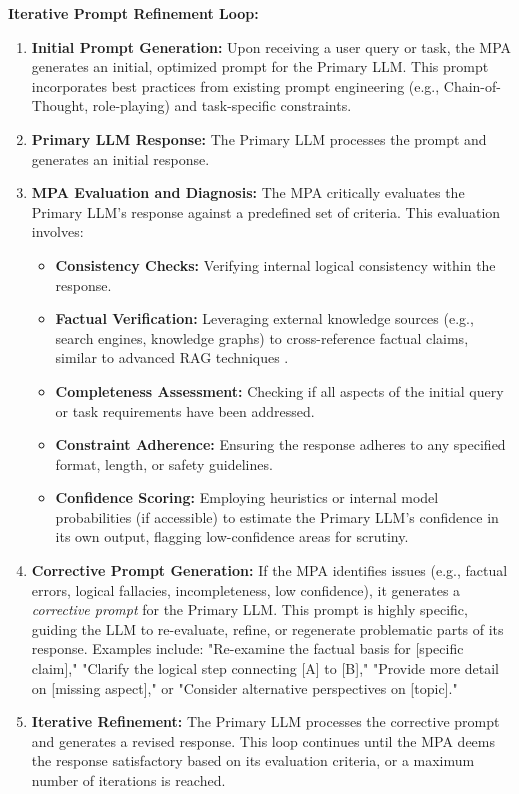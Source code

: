 \documentclass{article}
\begin{document}
\textbf{Iterative Prompt Refinement Loop:}
\begin{enumerate}
    \item \textbf{Initial Prompt Generation:} Upon receiving a user query or task, the MPA generates an initial, optimized prompt for the Primary LLM. This prompt incorporates best practices from existing prompt engineering (e.g., Chain-of-Thought, role-playing) and task-specific constraints.
    \item \textbf{Primary LLM Response:} The Primary LLM processes the prompt and generates an initial response.
    \item \textbf{MPA Evaluation and Diagnosis:} The MPA critically evaluates the Primary LLM's response against a predefined set of criteria. This evaluation involves:
    \begin{itemize}
        \item \textbf{Consistency Checks:} Verifying internal logical consistency within the response.
        \item \textbf{Factual Verification:} Leveraging external knowledge sources (e.g., search engines, knowledge graphs) to cross-reference factual claims, similar to advanced RAG techniques \cite{P5}.
        \item \textbf{Completeness Assessment:} Checking if all aspects of the initial query or task requirements have been addressed.
        \item \textbf{Constraint Adherence:} Ensuring the response adheres to any specified format, length, or safety guidelines.
        \item \textbf{Confidence Scoring:} Employing heuristics or internal model probabilities (if accessible) to estimate the Primary LLM's confidence in its own output, flagging low-confidence areas for scrutiny.
    \end{itemize}
    \item \textbf{Corrective Prompt Generation:} If the MPA identifies issues (e.g., factual errors, logical fallacies, incompleteness, low confidence), it generates a \textit{corrective prompt} for the Primary LLM. This prompt is highly specific, guiding the LLM to re-evaluate, refine, or regenerate problematic parts of its response. Examples include: "Re-examine the factual basis for [specific claim]," "Clarify the logical step connecting [A] to [B]," "Provide more detail on [missing aspect]," or "Consider alternative perspectives on [topic]."
    \item \textbf{Iterative Refinement:} The Primary LLM processes the corrective prompt and generates a revised response. This loop continues until the MPA deems the response satisfactory based on its evaluation criteria, or a maximum number of iterations is reached.
\end{enumerate}
\end{document}
